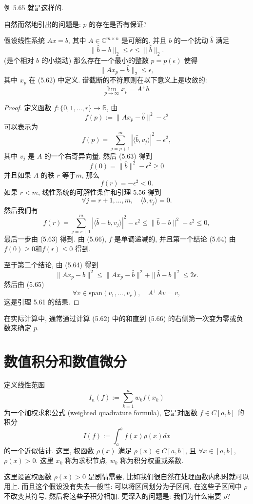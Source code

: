 \documentclass[a4paper]{ctexart}
\newcommand{\hl}[1]
{\noindent {\bf {#1}}}
\begin{document}
例 5.65 就是这样的. 

自然而然地引出的问题是: $p$ 的存在是否有保证? 

\hl{定理5.66} 假设线性系统 $Ax = b$, 其中 $A \in \mathbb{C}^{m \times n}$ 
是可解的, 并且 $b$ 的一个扰动 $\hat{b}$ 满足
\[ 
\|\hat{b} - b\|_2 \leq \epsilon \leq \|\hat{b}\|_2. 
\]
(是个相对 $b$ 的小绕动) 那么存在一个最小的整数 $p = p(\epsilon)$ 使得
\[ 
\|A x_p - \hat{b}\|_2 \leq \epsilon, 
\]
其中 $x_p$ 在 (5.62) 中定义. 谱截断的不符原则在以下意义上是收敛的:
\[ 
\lim_{p \to \infty} x_p = A^+ b. 
\]

\begin{proof}
定义函数 $f : \{0, 1, \ldots, r\} \rightarrow \mathbb{R}$, 
由
\[ 
f(p) := \|Ax_p - \hat{b}\|^2 - \epsilon^2 
\]
可以表示为
\[ 
f(p) = \sum_{j = p + 1}^{m} \left| \langle \hat{b}, v_j \rangle \right|^2 - \epsilon^2, 
\]
其中 $v_j$ 是 $A$ 的一个右奇异向量. 然后 (5.63) 得到
\[ 
f(0) = \|\hat{b}\|^2 - \epsilon^2 \geq 0 
\]
并且如果 $A$ 的秩 $r$ 等于$m$, 那么
\[ 
f(r) = -\epsilon^2 < 0. 
\]
如果 $r < m$, 线性系统的可解性条件和引理 5.56 得到
\[ 
\forall j = r + 1, \ldots, m, \quad \langle b, v_j \rangle = 0. 
\]
然后我们有
\[ 
f(r) = \sum_{j=r+1}^{m} \left| \langle \hat{b} - b, v_j \rangle \right|^2 - \epsilon^2 
\leq \|\hat{b} - b\|^2 - \epsilon^2 \leq 0, 
\]
最后一步由 (5.63) 得到. 由 (5.66), $f$ 是单调递减的, 
并且第一个结论 (5.64) 由 $f(0) \geq 0$和$f(r) \leq 0$ 得到. 

至于第二个结论, 由 (5.64) 得到
\[ 
\|Ax_p - b\|^2 \leq \|Ax_p - \hat{b}\|^2 + \|\hat{b} - b\|^2 \leq 2\epsilon. 
\]
然后由 (5.65)
\[ 
\forall v \in \text{span}(v_1, \ldots, v_r), \quad A^+Av = v, 
\]
这是引理 5.61 的结果. 
\end{proof}

在实际计算中, 通常通过计算 (5.62) 中的和直到 (5.66) 的右侧第一次变为零或负数来确定 $p$. 

\section{数值积分和数值微分}

\hl{定义 6.1} 定义线性范函 
$$
I_n(f) := \sum_{k = 1}^n w_k f(x_k)
$$
为一个加权求积公式 (weighted quadrature formula), 它是对函数 $f \in C[a, b]$ 的积分
$$
I(f) := \int_a^b f(x) \rho(x) dx
$$
的一个近似估计. 这里, 权函数 $\rho(x)$ 满足 $\rho(x) \in C[a, b]$, 
且 $\forall x \in [a, b]$, $\rho(x) > 0$. 这里 $x_k$ 称为求积节点, $w_k$ 
称为积分权重或系数.

这里设置权函数 $\rho(x) > 0$ 是剧情需要, 比如我们很自然在处理函数内积时就可以用上. 
而且这个假设没有失去一般性: 可以将区间划分为子区间, 在这些子区间中 $\rho$ 不改变其符号, 然后将这些子积分相加. 
更深入的问题是: 我们为什么需要 $\rho$?
\end{document}
